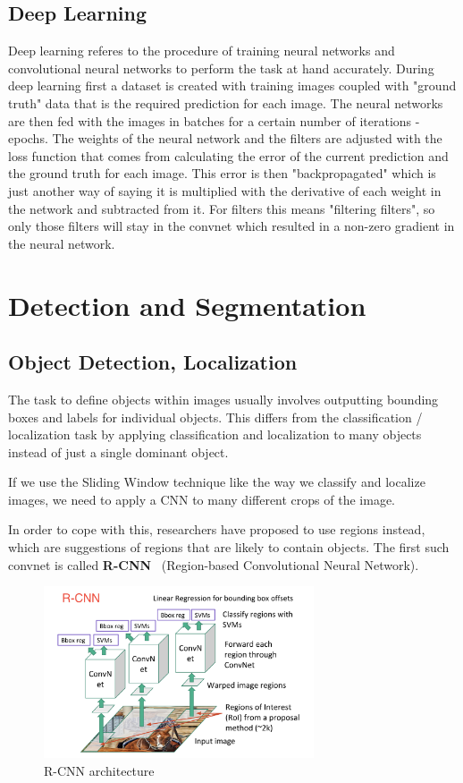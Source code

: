 \subsection{Deep Learning}
Deep learning referes to the procedure of training neural networks and
convolutional neural networks to perform the task at hand accurately. During
deep learning first a dataset is created with training images coupled with
"ground truth" data that is the required prediction for each image. The neural
networks are then fed with the images in batches for a certain number of
iterations - epochs. The weights of the neural network and the filters are
adjusted with the loss function that comes from calculating the error of the
current prediction and the ground truth for each image. This error is then
"backpropagated" which is just another way of saying it is multiplied with the
derivative of each weight in the network and subtracted from it. For filters this means
"filtering filters", so only those filters will stay in the convnet which
resulted in a non-zero gradient in the neural network.

\section{Detection and Segmentation}

\subsection{Object Detection, Localization}

The task to define objects within images usually involves outputting bounding
boxes and labels for individual objects. This differs from the
classification / localization task by applying classification and
localization to many objects instead of just a single dominant object.

If we use the Sliding Window technique like the way we classify and localize
images, we need to apply a CNN to many different crops of the image.

In order to cope with this, researchers have proposed to use regions
instead, which are suggestions of regions that are likely to contain
objects. The first such convnet is called
\textbf{R-CNN}~\cite{DBLP:journals/corr/GirshickDDM13} (Region-based
Convolutional Neural Network).

\begin{figure}[!ht]
    \centering
    \includegraphics[width=80mm, keepaspectratio]{figures/rcnn.jpeg}
    \caption{R-CNN architecture}
    \label{fig:rcnn}
\end{figure}

